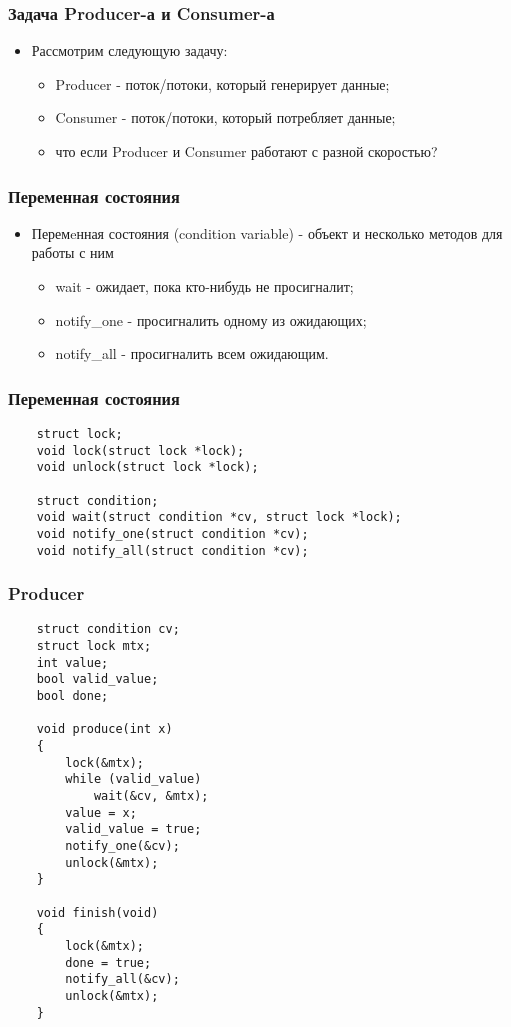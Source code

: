 \begin{frame}
\frametitle{Задача Producer-а и Consumer-а}
\begin{itemize}
    \item<1->Рассмотрим следующую задачу:
    \begin{itemize}
        \item<2->Producer - поток/потоки, который генерирует данные;
        \item<3->Consumer - поток/потоки, который потребляет данные;
        \item<4->что если Producer и Consumer работают с разной скоростью?
    \end{itemize}
\end{itemize}
\end{frame}

\begin{frame}
\frametitle{Переменная состояния}
\begin{itemize}
    \item<1->Перемeнная состояния (condition variable) - объект и несколько
         методов для работы с ним
    \begin{itemize}
        \item<2->wait - ожидает, пока кто-нибудь не просигналит;
        \item<3->notify\_one - просигналить одному из ожидающих;
        \item<4->notify\_all - просигналить всем ожидающим.
    \end{itemize}
\end{itemize}
\end{frame}

\begin{frame}[fragile]
\frametitle{Переменная состояния}
\begin{lstlisting}
    struct lock;
    void lock(struct lock *lock);
    void unlock(struct lock *lock);

    struct condition;
    void wait(struct condition *cv, struct lock *lock);
    void notify_one(struct condition *cv);
    void notify_all(struct condition *cv);
\end{lstlisting}
\end{frame}

\begin{frame}[fragile]
\frametitle{Producer}
\begin{lstlisting}
    struct condition cv;
    struct lock mtx;
    int value;
    bool valid_value;
    bool done;

    void produce(int x)
    {
        lock(&mtx);
        while (valid_value)
            wait(&cv, &mtx);
        value = x;
        valid_value = true;
        notify_one(&cv);
        unlock(&mtx);
    }

    void finish(void)
    {
        lock(&mtx);
        done = true;
        notify_all(&cv);
        unlock(&mtx);
    }
\end{lstlisting}
\end{frame}

